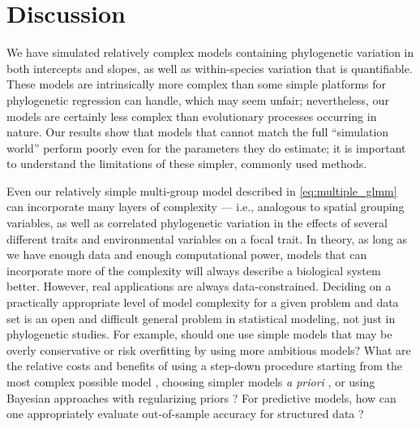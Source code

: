 \documentclass[12pt]{article}
\begin{document}

\section*{Discussion}



We have simulated relatively complex models containing phylogenetic variation in both intercepts and slopes, as well as within-species variation that is quantifiable.
These models are intrinsically more complex than some simple platforms for phylogenetic regression can handle, which may seem unfair; nevertheless, our models are certainly less complex than evolutionary processes occurring in nature.
Our results show that models that cannot match the full ``simulation world'' perform poorly even for the parameters they do estimate; it is important to understand the limitations of these simpler, commonly used methods.

Even our relatively simple multi-group model described in \ref{eq:multiple_glmm} can incorporate many layers of complexity --- i.e., analogous to spatial grouping variables, as well as correlated phylogenetic variation in the effects of several different traits and environmental variables on a focal trait.
In theory, as long as we have enough data and enough computational power, models that can incorporate more of the complexity will always describe a biological system better.
However, real applications are always data-constrained.
Deciding on a practically appropriate level of model complexity for a given problem and data set is an open and difficult general problem in statistical modeling, not just in phylogenetic studies.
For example, should one use simple models that may be overly conservative or
risk overfitting by using more ambitious models?
What are the relative costs and benefits of using a step-down procedure
starting from the most complex possible model \citep{barr2013random},
choosing simpler models \emph{a priori} \citep{baayen2008mixed},
or using Bayesian approaches with regularizing priors \citep{hadfield2010mcmc}?
For predictive models, how can one appropriately evaluate out-of-sample accuracy for
structured data \citep{roberts_cross-validation_2016}?
\end{document}
